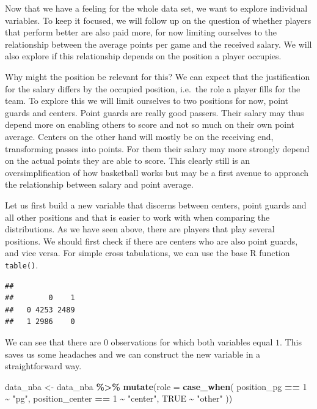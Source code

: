 \documentclass[
]{book}
\newenvironment{Shaded}{\begin{snugshade}}{\end{snugshade}}
\newcommand{\AttributeTok}[1]{\textcolor[rgb]{0.13,0.29,0.53}{#1}}
\newcommand{\ConstantTok}[1]{\textcolor[rgb]{0.56,0.35,0.01}{#1}}
\newcommand{\DecValTok}[1]{\textcolor[rgb]{0.00,0.00,0.81}{#1}}
\newcommand{\FunctionTok}[1]{\textcolor[rgb]{0.13,0.29,0.53}{\textbf{#1}}}
\newcommand{\NormalTok}[1]{#1}
\newcommand{\OtherTok}[1]{\textcolor[rgb]{0.56,0.35,0.01}{#1}}
\newcommand{\SpecialCharTok}[1]{\textcolor[rgb]{0.81,0.36,0.00}{\textbf{#1}}}
\newcommand{\StringTok}[1]{\textcolor[rgb]{0.31,0.60,0.02}{#1}}
\begin{document}
Now that we have a feeling for the whole data set, we want to explore individual variables. To keep it focused, we will follow up on the question of whether players that perform better are also paid more, for now limiting ourselves to the relationship between the average points per game and the received salary. We will also explore if this relationship depends on the position a player occupies.

Why might the position be relevant for this? We can expect that the justification for the salary differs by the occupied position, i.e.~the role a player fills for the team. To explore this we will limit ourselves to two positions for now, point guards and centers. Point guards are really good passers. Their salary may thus depend more on enabling others to score and not so much on their own point average. Centers on the other hand will mostly be on the receiving end, transforming passes into points. For them their salary may more strongly depend on the actual points they are able to score. This clearly still is an oversimplification of how basketball works but may be a first avenue to approach the relationship between salary and point average.

Let us first build a new variable that discerns between centers, point guards and all other positions and that is easier to work with when comparing the distributions. As we have seen above, there are players that play several positions. We should first check if there are centers who are also point guards, and vice versa. For simple cross tabulations, we can use the base R function \texttt{table()}.

\begin{Shaded}
\end{Shaded}

\begin{verbatim}
##    
##        0    1
##   0 4253 2489
##   1 2986    0
\end{verbatim}

We can see that there are \(0\) observations for which both variables equal \(1\). This saves us some headaches and we can construct the new variable in a straightforward way.

\begin{Shaded}
\begin{Highlighting}[]
\NormalTok{data\_nba }\OtherTok{\textless{}{-}}\NormalTok{ data\_nba }\SpecialCharTok{\%\textgreater{}\%} 
  \FunctionTok{mutate}\NormalTok{(}\AttributeTok{role =} \FunctionTok{case\_when}\NormalTok{(}
\NormalTok{    position\_pg }\SpecialCharTok{==} \DecValTok{1} \SpecialCharTok{\textasciitilde{}} \StringTok{"pg"}\NormalTok{,}
\NormalTok{    position\_center }\SpecialCharTok{==} \DecValTok{1} \SpecialCharTok{\textasciitilde{}} \StringTok{"center"}\NormalTok{,}
    \ConstantTok{TRUE} \SpecialCharTok{\textasciitilde{}} \StringTok{"other"}
\NormalTok{  ))}
\end{Highlighting}
\end{Shaded}
\end{document}
